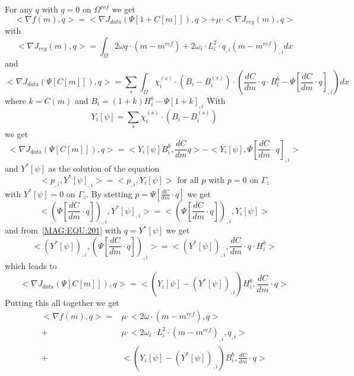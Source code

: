 For any $q$ with $q=0$ on $\Omega^{ref}$ we get 
\begin{equation}\label{MAG:EQU:202}
< \nabla f(m),q> = < \nabla J_{data}(\Psi[1+C[m]]), q>  +  \mu \cdot < \nabla J_{reg}(m),q>
\end{equation} 
with 
\begin{equation}\label{MAG:EQU:202a}
< \nabla J_{reg}(m),q> = 
\int_{\Omega} 2 \omega q \cdot (m-m^{ref}) + 2 \omega_i \cdot L_i^2 \cdot q_{,i} (m-m^{ref})_{,i} dx
\end{equation} 
and 
\begin{equation}\label{MAG:EQU:202b}
< \nabla J_{data}(\Psi[C[m]]), q> =  \sum_{s} \int_{\Omega} \chi^{(s)}_i \cdot (  B_i  -  B^{(s)}_i ) 
\cdot ( \frac{dC}{dm} \cdot q \cdot B^b_i  - \Psi[\frac{dC}{dm} \cdot q]_{,i}) dx 
\end{equation} 
where $k=C(m)$ and $B_i=(1+k) H^b_i  - \Psi[1+k]_{,i}$
With
\begin{equation}\label{MAG:EQU:202c}
Y_i[\psi]= \sum_{s} \chi^{(s)}_i \cdot (  B_i  -  B^{(s)}_i ) 
\end{equation} 
we get 
\begin{equation}\label{MAG:EQU:202bb}
< \nabla J_{data}(\Psi[C[m]]), q> = 
< Y_i[\psi] B^b_i, \frac{dC}{dm} q> - < Y_i[\psi] ,  \Psi[\frac{dC}{dm} \cdot q]_{,i} >
\end{equation} 
and $Y^*[\psi]$ as the solution of the equation 
\begin{equation}\label{MAG:EQU:202d}
< p_{,i},Y^*[\psi]_{,i} > =  < p_{,i} ,Y_i[\psi] > \mbox{ for all } p \mbox{ with } p=0 \mbox{ on } \Gamma_{z}
\end{equation} 
with $Y^*[\psi]=0$ on $\Gamma_{z}$. 
By stetting $p=\Psi[\frac{dC}{dm} \cdot q]$ we get
\begin{equation}\label{MAG:EQU:202e}
<(\Psi[\frac{dC}{dm} \cdot q]) _{,i},Y^*[\psi]_{,i} > =  < (\Psi[\frac{dC}{dm} \cdot q])_{,i} ,Y_i[\psi] >
\end{equation} 
and from~\ref{MAG:EQU:201} with $q=Y^*[\psi]$ we get
\begin{equation}\label{MAG:EQU:20e}
< (Y^*[\psi])_{,i},(\Psi[\frac{dC}{dm} \cdot q])_{,i} > = <(Y^*[\psi])_{,i} , \frac{dC}{dm} \cdot q \cdot H^b_i>
\end{equation}
which leads to 
\begin{equation}\label{MAG:EQU:202f}
< \nabla J_{data}(\Psi[C[m]]), q> = < ( Y_i[\psi] - (Y^*[\psi])_{,i} ) H^b_i,  \frac{dC}{dm} \cdot q>
\end{equation} 
Putting this all together we get
\begin{align}
< \nabla f(m),q> = &\mu \cdot < 2 \omega \cdot (m-m^{ref}), q>\nonumber\\
+ &\mu \cdot < 2 \omega_i \cdot L_i^2 \cdot (m-m^{ref})_{,i}, q_{,i}>\nonumber\\
+ &< ( Y_i[\psi] - (Y^*[\psi])_{,i} ) B^b_i,  \frac{dC}{dm} \cdot q>\label{MAG:EQU:202g}
\end{align}  


